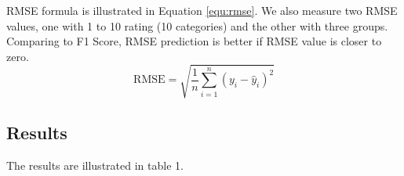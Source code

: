 RMSE formula is illustrated in Equation \eqref{equ:rmse}. We also measure two RMSE values, one with 1 to 10 rating (10 categories) and the other with three groups. Comparing to F1 Score, RMSE prediction is better if RMSE value is closer to zero.
\begin{equation}
    \text{RMSE} = \sqrt{\frac{1}{n} \sum_{i=1}^n (y_i - \hat{y}_i)^2}\label{equ:rmse}
\end{equation}
\subsection{Results} %
The results are illustrated in table 1. 